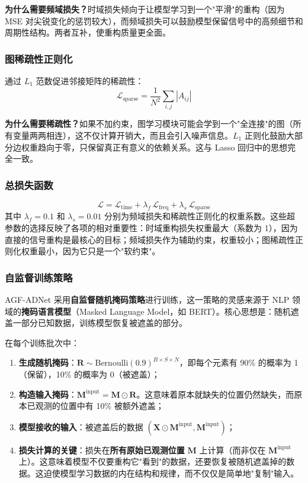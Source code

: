 \documentclass[UTF8]{ctexart}
\begin{document}
\textbf{为什么需要频域损失？}时域损失倾向于让模型学习到一个"平滑"的重构（因为 MSE 对尖锐变化的惩罚较大），而频域损失可以鼓励模型保留信号中的高频细节和周期性结构。两者互补，使重构质量更全面。

\subsubsection{图稀疏性正则化}

通过 $L_1$ 范数促进邻接矩阵的稀疏性：
\begin{equation}
    \mathcal{L}_{\text{sparse}} = \frac{1}{N^2} \sum_{i,j} |A_{ij}|
\end{equation}

\textbf{为什么需要稀疏性？}如果不加约束，图学习模块可能会学到一个"全连接"的图（所有变量两两相连），这不仅计算开销大，而且会引入噪声信息。$L_1$ 正则化鼓励大部分边权重趋向于零，只保留真正有意义的依赖关系。这与 Lasso 回归中的思想完全一致。

\subsubsection{总损失函数}

\begin{equation}
    \mathcal{L} = \mathcal{L}_{\text{time}} + \lambda_f \, \mathcal{L}_{\text{freq}} + \lambda_s \, \mathcal{L}_{\text{sparse}}
\end{equation}
其中 $\lambda_f = 0.1$ 和 $\lambda_s = 0.01$ 分别为频域损失和稀疏性正则化的权重系数。这些超参数的选择反映了各项的相对重要性：时域重构损失权重最大（系数为 1），因为直接的信号重构是最核心的目标；频域损失作为辅助约束，权重较小；图稀疏性正则化权重最小，因为它只是一个"软约束"。

\subsubsection{自监督训练策略}

AGF-ADNet 采用\textbf{自监督随机掩码策略}进行训练，这一策略的灵感来源于 NLP 领域的\textbf{掩码语言模型}（Masked Language Model，如 BERT）。核心思想是：随机遮盖一部分已知数据，训练模型恢复被遮盖的部分。

在每个训练批次中：
\begin{enumerate}
    \item \textbf{生成随机掩码}：$\mathbf{R} \sim \mathrm{Bernoulli}(0.9)^{B \times S \times N}$，即每个元素有 90\% 的概率为 1（保留），10\% 的概率为 0（被遮盖）；
    \item \textbf{构造输入掩码}：$\mathbf{M}^{\text{input}} = \mathbf{M} \odot \mathbf{R}$。这意味着原本就缺失的位置仍然缺失，而原本已观测的位置中有 10\% 被额外遮盖；
    \item \textbf{模型接收的输入}：被遮盖后的数据 $(\mathbf{X} \odot \mathbf{M}^{\text{input}}, \mathbf{M}^{\text{input}})$；
    \item \textbf{损失计算的关键}：损失在\textbf{所有原始已观测位置} $\mathbf{M}$ 上计算（而非仅在 $\mathbf{M}^{\text{input}}$ 上）。这意味着模型不仅要重构它"看到"的数据，还要恢复被随机遮盖掉的数据。这迫使模型学习数据的内在结构和规律，而不仅仅是简单地"复制"输入。
\end{enumerate}
\end{document}
